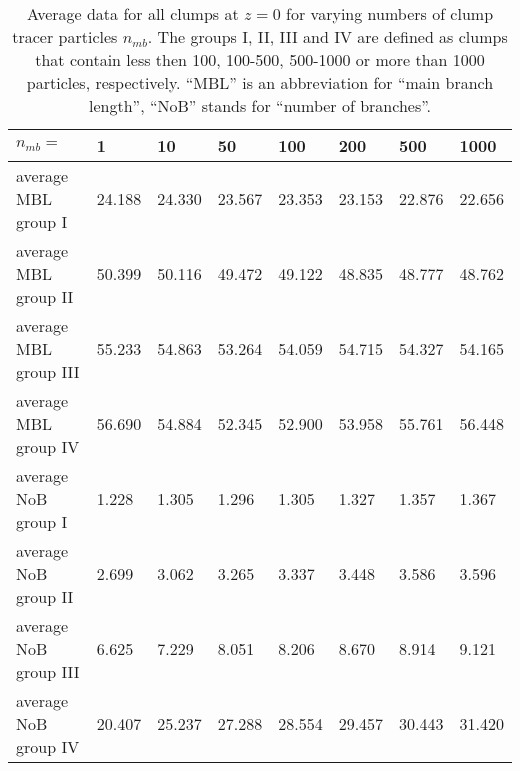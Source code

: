 \begin{table}[ht]
	\begin{center}
		{\small 
		\begin{tabular}[c]{l | p{1cm} | p{1cm} | p{1cm} | p{1cm} | p{1cm} | p{1cm} | p{1cm} |}
			$n_{mb}=$								&	1 		& 	10 		& 	50 		& 	100 	& 200 	& 500 		& 1000 \\
			\hline
			average MBL group I		&	24.188	& 	24.330	& 	23.567	&	23.353 	& 23.153 & 22.876 	& 22.656  \\	
			average MBL group II		&	50.399	& 	50.116	& 	49.472	&	49.122 	& 48.835 & 48.777 	& 48.762  \\	
			average MBL group III	&	55.233	& 	54.863	& 	53.264	&	54.059 	& 54.715 & 54.327 	& 54.165  \\	
			average MBL group IV		&	56.690	& 	54.884 	& 	52.345	&	52.900 	& 53.958 & 55.761 	& 56.448  \\
			\hline
			average NoB group I		&	1.228	& 	1.305	& 	1.296	&	1.305 	& 1.327  & 1.357 	& 1.367  \\	
			average NoB group II		&	2.699	& 	3.062	& 	3.265	&	3.337 	& 3.448  & 3.586 	& 3.596  \\	
			average NoB group III	&	6.625	& 	7.229	& 	8.051	&	8.206 	& 8.670  & 8.914 	& 9.121  \\	
			average NoB group IV		&	20.407	& 	25.237	& 	27.288	&	28.554 	& 29.457 & 30.443 	& 31.420  \\	
			\hline	
		\end{tabular}
		}
	\caption{
		Average data for all clumps at $z=0$ for varying numbers of clump tracer particles $n_{mb}$. 
		The groups I, II, III and IV are defined as clumps that contain less then 100, 100-500, 500-1000 or more than 1000 particles, respectively.
		``MBL'' is an abbreviation for ``main branch length'', ``NoB'' stands for ``number of branches''.
		}
	\label{tab:ntracers}
	\end{center}	
\end{table}